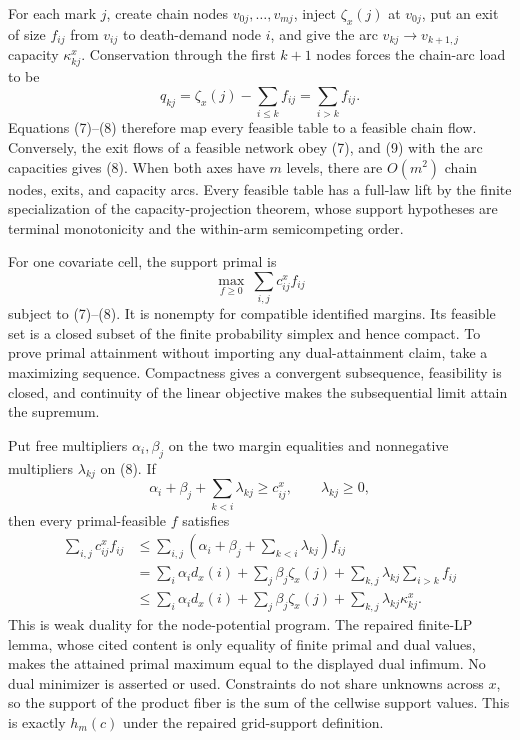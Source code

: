 For each mark \(j\), create chain nodes \(v_{0j},\ldots,v_{mj}\), inject \(\zeta_x(j)\) at \(v_{0j}\), put an exit of size \(f_{ij}\) from \(v_{ij}\) to death-demand node \(i\), and give the arc \(v_{kj}\to v_{k+1,j}\) capacity \(\kappa^x_{kj}\).  Conservation through the first \(k+1\) nodes forces the chain-arc load to be
\[
q_{kj}=\zeta_x(j)-\sum_{i\leq k}f_{ij}
=\sum_{i>k}f_{ij}.                                                    \tag{9}
\]
Equations (7)--(8) therefore map every feasible table to a feasible chain flow.  Conversely, the exit flows of a feasible network obey (7), and (9) with the arc capacities gives (8).  When both axes have \(m\) levels, there are \(O(m^2)\) chain nodes, exits, and capacity arcs.  Every feasible table has a full-law lift by the finite specialization of the capacity-projection theorem, whose support hypotheses are terminal monotonicity and the within-arm semicompeting order.

For one covariate cell, the support primal is
\[
\max_{f\geq0}\ \sum_{i,j}c^x_{ij}f_{ij}
\]
subject to (7)--(8).  It is nonempty for compatible identified margins.  Its feasible set is a closed subset of the finite probability simplex and hence compact.  To prove primal attainment without importing any dual-attainment claim, take a maximizing sequence.  Compactness gives a convergent subsequence, feasibility is closed, and continuity of the linear objective makes the subsequential limit attain the supremum.

Put free multipliers \(\alpha_i,\beta_j\) on the two margin equalities and nonnegative multipliers \(\lambda_{kj}\) on (8).  If
\[
\alpha_i+\beta_j+\sum_{k<i}\lambda_{kj}\geq c^x_{ij},
\qquad \lambda_{kj}\geq0,                                          \tag{10}
\]
then every primal-feasible \(f\) satisfies
\[
\begin{aligned}
\sum_{i,j}c^x_{ij}f_{ij}
&\leq\sum_{i,j}\left(\alpha_i+\beta_j+
\sum_{k<i}\lambda_{kj}\right)f_{ij}\\
&=\sum_i\alpha_i d_x(i)+\sum_j\beta_j\zeta_x(j)
+\sum_{k,j}\lambda_{kj}\sum_{i>k}f_{ij}\\
&\leq\sum_i\alpha_i d_x(i)+\sum_j\beta_j\zeta_x(j)
+\sum_{k,j}\lambda_{kj}\kappa^x_{kj}.                              \tag{11}
\end{aligned}
\]
This is weak duality for the node-potential program.  The repaired finite-LP lemma, whose cited content is only equality of finite primal and dual values, makes the attained primal maximum equal to the displayed dual infimum.  No dual minimizer is asserted or used.  Constraints do not share unknowns across \(x\), so the support of the product fiber is the sum of the cellwise support values.  This is exactly \(h_m(c)\) under the repaired grid-support definition.
